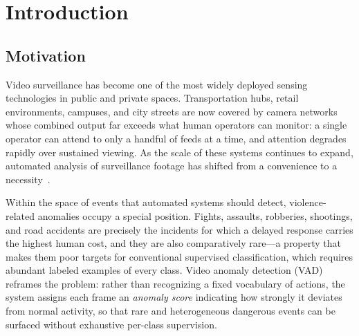 \chapter{Introduction}
\label{ch:01}

\section{Motivation}
\label{sec:intro-motivation}

Video surveillance has become one of the most widely deployed sensing technologies in public and
private spaces. Transportation hubs, retail environments, campuses, and city streets are now covered
by camera networks whose combined output far exceeds what human operators can monitor: a single
operator can attend to only a handful of feeds at a time, and attention degrades rapidly over
sustained viewing. As the scale of these systems continues to expand, automated analysis of
surveillance footage has shifted from a convenience to a necessity~\cite{sultani2018ucfcrime}.

Within the space of events that automated systems should detect, violence-related anomalies occupy a
special position. Fights, assaults, robberies, shootings, and road accidents are precisely the
incidents for which a delayed response carries the highest human cost, and they are also
comparatively rare---a property that makes them poor targets for conventional supervised
classification, which requires abundant labeled examples of every class. Video anomaly detection
(VAD) reframes the problem: rather than recognizing a fixed vocabulary of actions, the system
assigns each frame an \emph{anomaly score} indicating how strongly it deviates from normal activity,
so that rare and heterogeneous dangerous events can be surfaced without exhaustive per-class
supervision.

